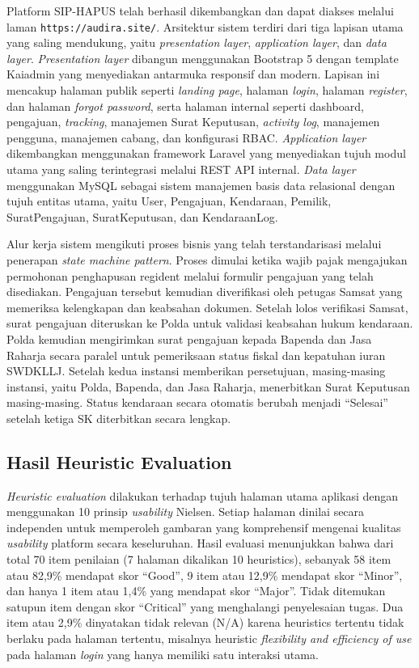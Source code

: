 \documentclass[conference]{IEEEtran}
\begin{document}
Platform SIP-HAPUS telah berhasil dikembangkan dan dapat diakses melalui laman
\texttt{https://audira.site/}. Arsitektur sistem terdiri dari tiga lapisan utama
yang saling mendukung, yaitu \emph{presentation layer}, \emph{application layer},
dan \emph{data layer}. \emph{Presentation layer} dibangun menggunakan Bootstrap 5
dengan template Kaiadmin yang menyediakan antarmuka responsif dan modern. Lapisan
ini mencakup halaman publik seperti \emph{landing page}, halaman \emph{login},
halaman \emph{register}, dan halaman \emph{forgot password}, serta halaman internal
seperti dashboard, pengajuan, \emph{tracking}, manajemen Surat Keputusan,
\emph{activity log}, manajemen pengguna, manajemen cabang, dan konfigurasi RBAC.
\emph{Application layer} dikembangkan menggunakan framework Laravel yang menyediakan
tujuh modul utama yang saling terintegrasi melalui REST API internal. \emph{Data
layer} menggunakan MySQL sebagai sistem manajemen basis data relasional dengan tujuh
entitas utama, yaitu User, Pengajuan, Kendaraan, Pemilik, SuratPengajuan,
SuratKeputusan, dan KendaraanLog.

Alur kerja sistem mengikuti proses bisnis yang telah terstandarisasi melalui
penerapan \emph{state machine pattern}. Proses dimulai ketika wajib pajak mengajukan
permohonan penghapusan regident melalui formulir pengajuan yang telah disediakan.
Pengajuan tersebut kemudian diverifikasi oleh petugas Samsat yang memeriksa kelengkapan
dan keabsahan dokumen. Setelah lolos verifikasi Samsat, surat pengajuan diteruskan
ke Polda untuk validasi keabsahan hukum kendaraan. Polda kemudian mengirimkan surat
pengajuan kepada Bapenda dan Jasa Raharja secara paralel untuk pemeriksaan status fiskal
dan kepatuhan iuran SWDKLLJ. Setelah kedua instansi memberikan persetujuan,
masing-masing instansi, yaitu Polda, Bapenda, dan Jasa Raharja, menerbitkan Surat
Keputusan masing-masing. Status kendaraan secara otomatis berubah menjadi ``Selesai''
setelah ketiga SK diterbitkan secara lengkap.

\subsection{Hasil Heuristic Evaluation}
\label{subsec:heuristic}

\emph{Heuristic evaluation} dilakukan terhadap tujuh halaman utama aplikasi dengan
menggunakan 10 prinsip \emph{usability} Nielsen. Setiap halaman dinilai secara
independen untuk memperoleh gambaran yang komprehensif mengenai kualitas
\emph{usability} platform secara keseluruhan. Hasil evaluasi menunjukkan bahwa dari
total 70 item penilaian (7 halaman dikalikan 10 heuristics), sebanyak 58 item atau
82,9\% mendapat skor ``Good'', 9 item atau 12,9\% mendapat skor ``Minor'', dan
hanya 1 item atau 1,4\% yang mendapat skor ``Major''. Tidak ditemukan satupun item
dengan skor ``Critical'' yang menghalangi penyelesaian tugas. Dua item atau 2,9\%
dinyatakan tidak relevan (N/A) karena heuristics tertentu tidak berlaku pada halaman
tertentu, misalnya heuristic \emph{flexibility and efficiency of use} pada halaman
\emph{login} yang hanya memiliki satu interaksi utama.
\end{document}
